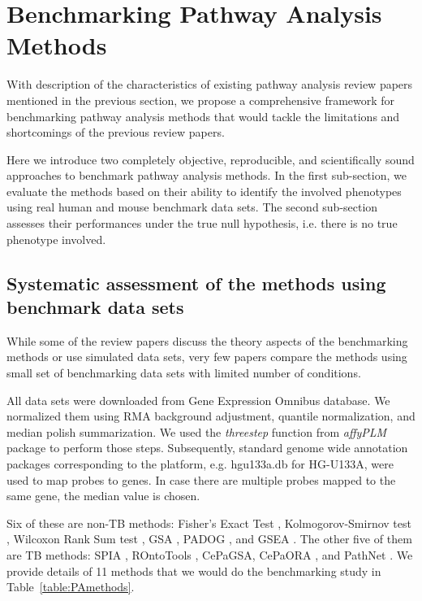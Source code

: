 \section{Benchmarking Pathway Analysis Methods}

With description of the characteristics of existing pathway analysis review papers mentioned in the previous section, we propose a comprehensive framework for benchmarking pathway analysis methods that would tackle the limitations and shortcomings of the previous review papers.

Here we introduce two completely objective, reproducible, and scientifically sound approaches to benchmark pathway analysis methods. In the first sub-section, we evaluate the methods based on their ability to identify the involved phenotypes using real human and mouse benchmark data sets. The second sub-section assesses their performances under the true null hypothesis, i.e. there is no true phenotype involved.

\subsection{Systematic assessment of the methods using benchmark data sets}

While some of the review papers discuss the theory aspects of the benchmarking methods or use simulated data sets, very few papers compare the methods using small set of benchmarking data sets with limited number of conditions. 

All   data sets were downloaded from Gene Expression Omnibus database. We normalized them using RMA background adjustment, quantile normalization, and median polish summarization.  We used the \textit{threestep} function from \textit{affyPLM} package to perform those steps. Subsequently, standard genome wide annotation packages corresponding to the platform, e.g. hgu133a.db for HG-U133A, were used to map probes to genes. In case there are multiple probes mapped to the same gene, the median value is chosen.

Six of these are non-TB methods: Fisher's Exact Test \cite{Fisher:1951}, Kolmogorov-Smirnov test \cite{massey1951kolmogorov}, Wilcoxon Rank Sum test \cite{wilcoxon1945individual}, GSA \cite{Efron:2007}, PADOG \cite{Tarca2012down}, and GSEA \cite{Subramanian:2005}. The other five of them are TB methods: SPIA \cite{SPIAversion2.14.0}, ROntoTools \cite{RontoToolsVersion1.2.0}, CePaGSA, CePaORA \cite{gu2012centrality, gu2013cepa}, and PathNet \cite{Dutta:2012}. We provide details of 11 methods that we would do the benchmarking study in Table~\ref{table:PAmethods}. 

